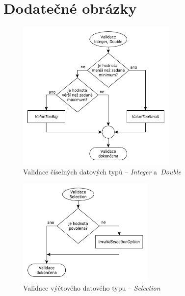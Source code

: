 \documentclass[FM,bw,DP]{tulthesis}
\begin{document}
\chapter{Dodatečné obrázky}

\begin{figure}[h]
	\centering
    \includegraphics[width=0.7\textwidth]{../img/validation_number.pdf}
    \caption{Validace číselných datových typů -- \textit{Integer} a~\textit{Double}}
	\label{img:validation_number}
\end{figure}

\begin{figure}[h]
	\centering
    \includegraphics[width=0.6\textwidth]{../img/validation_selection.pdf}
    \caption{Validace výčtového datového typu -- \textit{Selection}}
	\label{img:validation_selection}
\end{figure}
\end{document}
